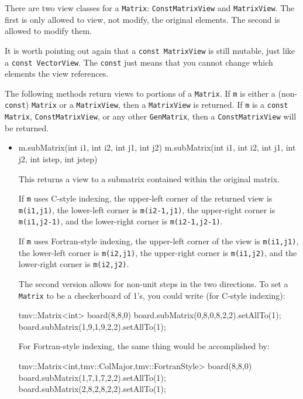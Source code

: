 \documentclass[twoside,letterpaper,11pt]{article}
\renewcommand{\tt}[1]{{\lstinline {#1}}}
\begin{document}
There are two view classes for
a \tt{Matrix}:
\tt{ConstMatrixView} and \tt{MatrixView}.  
The first is only allowed to view,
not modify, the original elements.  The second is allowed to modify them.

It is worth pointing out again that a 
\tt{const MatrixView} is still mutable, just like a \tt{const VectorView}.
The \tt{const} just means that you cannot change which elements
the view references.

The following methods return views to portions of a \tt{Matrix}.
If \tt{m} is either a (non-\tt{const}) \tt{Matrix}
or a \tt{MatrixView}, then a \tt{MatrixView} is returned.
If \tt{m} is a \tt{const Matrix}, \tt{ConstMatrixView}, or any other \tt{GenMatrix},
then a \tt{ConstMatrixView} will be returned. 

\begin{itemize}
\item
\begin{tmvcode}
m.subMatrix(int i1, int i2, int j1, int j2)
m.subMatrix(int i1, int i2, int j1, int j2, int istep, int jstep)
\end{tmvcode}
This returns a view to a submatrix contained within the original matrix.

If \tt{m} uses C-style indexing, 
the upper-left corner of the returned view is \tt{m(i1,j1)},
the lower-left corner is \tt{m(i2-1,j1)},
the upper-right corner is \tt{m(i1,j2-1)}, and
the lower-right corner is \tt{m(i2-1,j2-1)}.

If \tt{m} uses Fortran-style indexing, 
the upper-left corner of the view is \tt{m(i1,j1)},
the lower-left corner is \tt{m(i2,j1)},
the upper-right corner is \tt{m(i1,j2)}, and
the lower-right corner is \tt{m(i2,j2)}.

The second version allows for non-unit steps in the two directions.
To set a \tt{Matrix} to be a checkerboard of 1's, you could write 
(for C-style indexing):
\begin{tmvcode}
tmv::Matrix<int> board(8,8,0)
board.subMatrix(0,8,0,8,2,2).setAllTo(1);
board.subMatrix(1,9,1,9,2,2).setAllTo(1);
\end{tmvcode}

For Fortran-style indexing, the same thing would be accomplished by:
\begin{tmvcode}
tmv::Matrix<int,tmv::ColMajor,tmv::FortranStyle> board(8,8,0)
board.subMatrix(1,7,1,7,2,2).setAllTo(1);
board.subMatrix(2,8,2,8,2,2).setAllTo(1);
\end{tmvcode}


\end{itemize}
\end{document}
